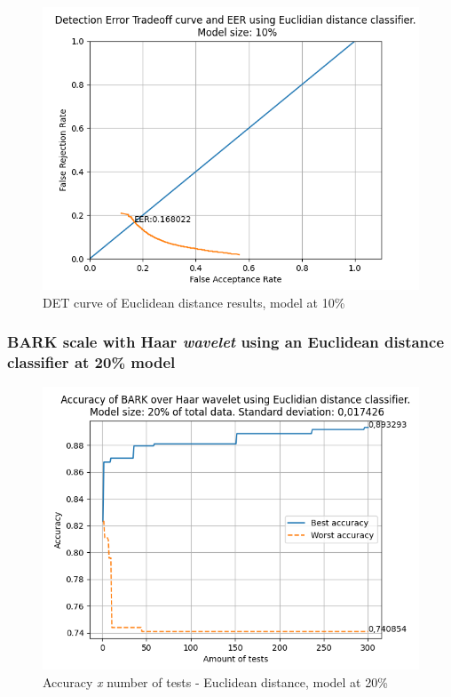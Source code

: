 			\begin{figure}[H]
				\centering
				\includegraphics[scale=.6]{images/results/det/DET_for_classifier_Euclidian_10}
				\caption{DET curve of Euclidean distance results, model at 10\% }
				\label{fig:detforclassifiereuclidian10}
			\end{figure}
		
			

		\subsubsection{BARK scale with Haar \textit{wavelet} using an Euclidean distance classifier at 20\% model}
		
			\begin{figure}[H]
				\centering
				\includegraphics[scale=.6]{images/results/confusionMatrices/classifier_Euclidian_20}
				\caption{Accuracy \textit {x} number of tests - Euclidean distance, model at 20\%}
				\label{fig:classifiereuclidian20}
			\end{figure}
				
